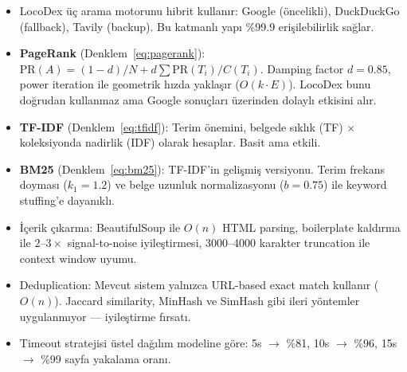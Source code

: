 \begin{ozet}
\begin{itemize}
  \item LocoDex \"{u}\c{c} arama motorunu hibrit kullan{\i}r: Google (\"{o}ncelikli), DuckDuckGo (fallback), Tavily (backup). Bu katmanl{\i} yap{\i} \%99.9 eri\c{s}ilebilirlik sa\u{g}lar.

  \item \textbf{PageRank} (Denklem~\ref{eq:pagerank}): $\text{PR}(A) = (1-d)/N + d \sum \text{PR}(T_i)/C(T_i)$. Damping factor $d = 0.85$, power iteration ile geometrik h{\i}zda yakla\c{s}{\i}r ($O(k \cdot E)$). LocoDex bunu do\u{g}rudan kullanmaz ama Google sonu\c{c}lar{\i} \"{u}zerinden dolayl{\i} etkisini al{\i}r.

  \item \textbf{TF-IDF} (Denklem~\ref{eq:tfidf}): Terim \"{o}nemini, belgede s{\i}kl{\i}k (TF) $\times$ koleksiyonda nadirlik (IDF) olarak hesaplar. Basit ama etkili.

  \item \textbf{BM25} (Denklem~\ref{eq:bm25}): TF-IDF'in geli\c{s}mi\c{s} versiyonu. Terim frekans doymas{\i} ($k_1 = 1.2$) ve belge uzunluk normalizasyonu ($b = 0.75$) ile keyword stuffing'e dayan{\i}kl{\i}.

  \item \.{I}\c{c}erik \c{c}{\i}karma: BeautifulSoup ile $O(n)$ HTML parsing, boilerplate kald{\i}rma ile $2\text{--}3\times$ signal-to-noise iyile\c{s}tirmesi, 3000--4000 karakter truncation ile context window uyumu.

  \item Deduplication: Mevcut sistem yaln{\i}zca URL-based exact match kullan{\i}r ($O(n)$). Jaccard similarity, MinHash ve SimHash gibi ileri y\"{o}ntemler uygulanm{\i}yor --- iyile\c{s}tirme f{\i}rsat{\i}.

  \item Timeout stratejisi \"{u}stel da\u{g}{\i}l{\i}m modeline g\"{o}re: 5s $\to$ \%81, 10s $\to$ \%96, 15s $\to$ \%99 sayfa yakalama oran{\i}.
\end{itemize}
\end{ozet}
